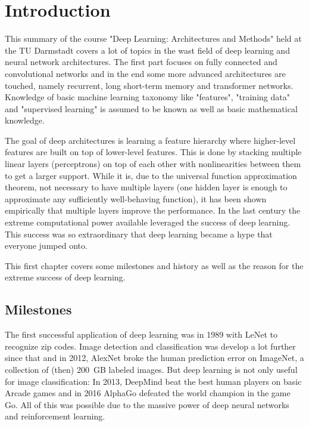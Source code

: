 
\usetikzlibrary{math}


\chapter{Introduction}
	This summary of the course "Deep Learning: Architectures and Methods" held at the TU Darmstadt covers a lot of topics in the wast field of deep learning and neural network architectures. The first part focuses on fully connected and convolutional networks and in the end some more advanced architectures are touched, namely recurrent, long short-term memory and transformer networks. Knowledge of basic machine learning taxonomy like "features", "training data" and "supervised learning" is assumed to be known as well as basic mathematical knowledge.

	The goal of deep architectures is learning a feature hierarchy where higher-level features are built on top of lower-level features. This is done by stacking multiple linear layers (perceptrons) on top of each other with nonlinearities between them to get a larger support. While it is, due to the universal function approximation theorem, not necessary to have multiple layers (one hidden layer is enough to approximate any sufficiently well-behaving function), it has been shown empirically that multiple layers improve the performance. In the last century the extreme computational power available leveraged the success of deep learning. This success was so extraordinary that deep learning became a hype that everyone jumped onto.

	This first chapter covers some milestones and history as well as the reason for the extreme success of deep learning.

	\section{Milestones}
		The first successful application of deep learning was in 1989 with LeNet to recognize zip codes. Image detection and classification was develop a lot further since that and in 2012, AlexNet broke the human prediction error on ImageNet, a collection of (then) \SI{200}{GB} labeled images. But deep learning is not only useful for image classification: In 2013, DeepMind beat the best human players on basic Arcade games and in 2016 AlphaGo defeated the world champion in the game Go. All of this was possible due to the massive power of deep neural networks and reinforcement learning.

